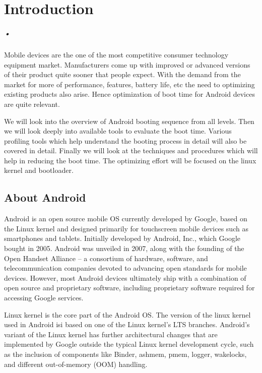 

\chapter{Introduction}
\label{report}
\paragraph*{•}

\hspace{8mm} 

\noindent Mobile devices are the one of the most competitive consumer technology equipment market.
Manufacturers come up with improved or advanced versions of their product quite sooner that
people expect. With the demand from the market for more of performance, features, battery
life, etc the need to optimizing existing products also arise. Hence optimization of boot time
for Android devices are quite relevant.

We will look into the overview of Android booting sequence from all levels. Then we will look
deeply into available tools to evaluate the boot time. Various profiling tools which help understand
the booting process in detail will also be covered in detail. Finally we will look at the techniques
and procedures which will help in reducing the boot time. The optimizing effort will be focused on the
linux kernel and bootloader.

\section{About Android}

Android is an open source mobile OS currently developed by Google, based on the Linux kernel and designed
primarily for touchscreen mobile devices such as smartphones and tablets. Initially developed
by Android, Inc., which Google bought in 2005. Android was unveiled in 2007, along with the
founding of the Open Handset Alliance – a consortium of hardware, software, and telecommunication
companies devoted to advancing open standards for mobile devices. However, most Android devices
ultimately ship with a combination of open source and proprietary software, including proprietary
software required for accessing Google services.


Linux kernel is the core part of the Android OS. The version of the linux kernel used in Android isi
based on one of the Linux kernel's LTS branches. Android's variant of the Linux kernel has further
architectural changes that are implemented by Google outside the typical Linux kernel development
cycle, such as the inclusion of components like Binder, ashmem, pmem, logger, wakelocks,
and different out-of-memory (OOM) handling.

